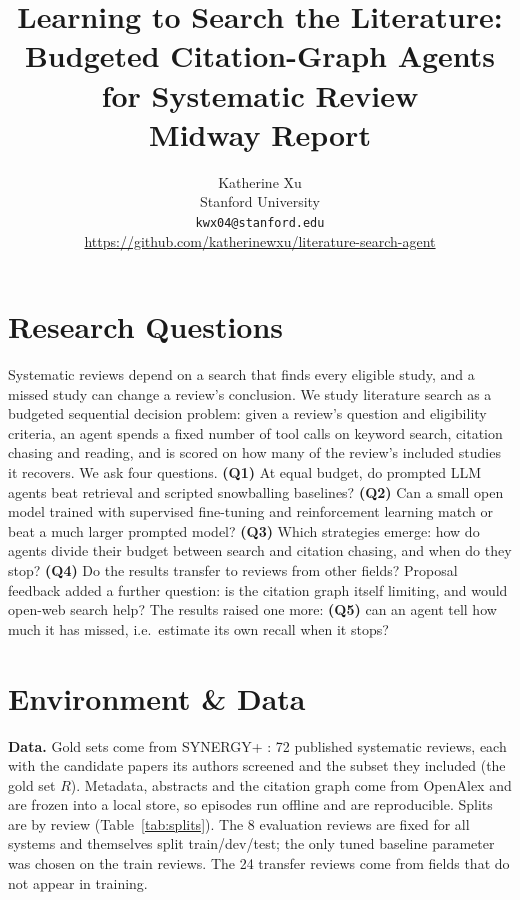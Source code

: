 \documentclass{article} %
\title{Learning to Search the Literature: \\
Budgeted Citation-Graph Agents for Systematic Review \\
\large Midway Report}
\author{Katherine Xu \\
Stanford University \\
\texttt{kwx04@stanford.edu} \\
\url{https://github.com/katherinewxu/literature-search-agent}}
\begin{document}
\maketitle
{}
\thispagestyle{fancy}

\section{Research Questions}

Systematic reviews depend on a search that finds every eligible study, and a missed study can
change a review's conclusion. We study literature search as a budgeted sequential decision
problem: given a review's question and eligibility criteria, an agent spends a fixed number of
tool calls on keyword search, citation chasing and reading, and is scored on how many of the
review's included studies it recovers. We ask four questions.
\textbf{(Q1)} At equal budget, do prompted LLM agents beat retrieval and scripted snowballing
baselines?
\textbf{(Q2)} Can a small open model trained with supervised fine-tuning and reinforcement learning
match or beat a much larger prompted model?
\textbf{(Q3)} Which strategies emerge: how do agents divide their budget between search and
citation chasing, and when do they stop?
\textbf{(Q4)} Do the results transfer to reviews from other fields?
Proposal feedback added a further question: is the citation graph itself limiting, and would
open-web search help? The results raised one more: \textbf{(Q5)} can an agent tell how much it has
missed, i.e.\ estimate its own recall when it stops?

\section{Environment \& Data}

\textbf{Data.} Gold sets come from SYNERGY+ \citep{debruin2023synergy}: 72 published systematic
reviews, each with the candidate papers its authors screened and the subset they included (the
gold set $R$). Metadata, abstracts and the citation graph come from OpenAlex
\citep{priem2022openalex} and are frozen into a local store, so episodes run offline and are
reproducible. Splits are by review (Table~\ref{tab:splits}). The 8 evaluation reviews are fixed
for all systems and themselves split train/dev/test; the only tuned baseline parameter was chosen
on the train reviews. The 24 transfer reviews come from fields that do not appear in training.
\end{document}
